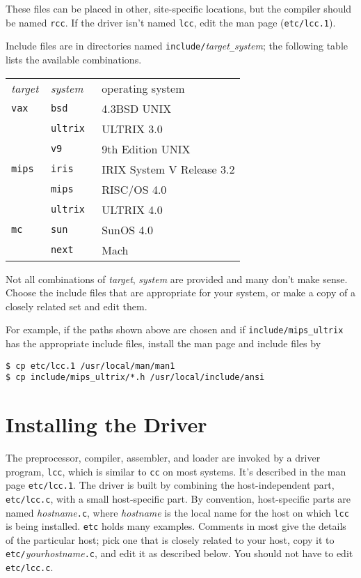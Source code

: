 These files can be placed in other, site-specific locations,
but the compiler should be named \verb|rcc|.
If the driver isn't named \verb|lcc|, edit the man page (\verb|etc/lcc.1|).

Include files are in directories named \verb|include/|{\it target}\verb|_|{\it system};
the following table lists the available combinations.
\begin{center}
\begin{tabular}{lll}
\em target	& \em system	& operating system \\[0.5ex]
\tt vax		& \tt bsd 	& 4.3BSD UNIX \\
		& \tt ultrix	& ULTRIX 3.0 \\
		& \tt v9	& 9th Edition UNIX \\
\tt mips	& \tt iris	& IRIX System V Release 3.2 \\
		& \tt mips	& RISC/OS 4.0 \\
		& \tt ultrix	& ULTRIX 4.0 \\
\tt mc		& \tt sun	& SunOS 4.0 \\
		& \tt next	& Mach \\
\end{tabular}
\end{center}
Not all combinations of {\it target}, {\it system\/} are provided
and many don't make sense.
Choose the include files that are appropriate for your system,
or make a copy of a closely related set and edit them.

For example, if the paths shown above are chosen and if
\verb|include/mips_ultrix| has the appropriate include files,
install the man page and include files by
\begin{verbatim}
$ cp etc/lcc.1 /usr/local/man/man1
$ cp include/mips_ultrix/*.h /usr/local/include/ansi
\end{verbatim}

\section{Installing the Driver}\label{driver}

The preprocessor, compiler, assembler, and loader are
invoked by a driver program, \verb|lcc|, which is similar
to \verb|cc| on most systems. It's described in the man page
\verb|etc/lcc.1|.
The driver is built by combining the host-independent
part, \verb|etc/lcc.c|, with a small host-specific part.
By convention, host-specific parts are named {\it hostname}\verb|.c|,
where {\it hostname\/} is the local name for the host on which \verb|lcc|
is being installed. \verb|etc| holds many examples.
Comments in most give the details of the
particular host; pick one that is closely related to your host,
copy it to \verb|etc/|{\it yourhostname}\verb|.c|,
and edit it as described below.
You should not have to edit \verb|etc/lcc.c|.

